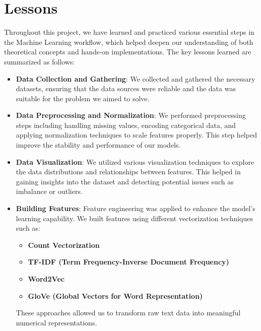 \section{Lessons}

Throughout this project, we have learned and practiced various essential steps in the Machine Learning workflow, which helped deepen our understanding of both theoretical concepts and hands-on implementations. The key lessons learned are summarized as follows:

\begin{itemize}
    \item \textbf{Data Collection and Gathering}: 
    We collected and gathered the necessary datasets, ensuring that the data sources were reliable and the data was suitable for the problem we aimed to solve.

    \item \textbf{Data Preprocessing and Normalization}: 
    We performed preprocessing steps including handling missing values, encoding categorical data, and applying normalization techniques to scale features properly. This step helped improve the stability and performance of our models.

    \item \textbf{Data Visualization}: 
    We utilized various visualization techniques to explore the data distributions and relationships between features. This helped in gaining insights into the dataset and detecting potential issues such as imbalance or outliers.

    \item \textbf{Building Features}: 
    Feature engineering was applied to enhance the model's learning capability. We built features using different vectorization techniques such as:
    \begin{itemize}
        \item \textbf{Count Vectorization}
        \item \textbf{TF-IDF (Term Frequency-Inverse Document Frequency)}
        \item \textbf{Word2Vec}
        \item \textbf{GloVe (Global Vectors for Word Representation)}
    \end{itemize}
    These approaches allowed us to transform raw text data into meaningful numerical representations.


\end{itemize}
